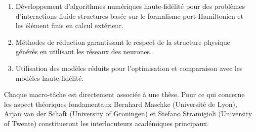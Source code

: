 \documentclass[12pt, french]{article}
\begin{document}
\begin{enumerate}
	\item Développement d'algorithmes numériques haute-fidélité pour des problèmes d'interactions fluide-structures basée sur le formalisme port-Hamiltonien et les élément finis en calcul extérieur.
	\item Méthodes de réduction garantissant le respect de la structure physique générés en utilisant les réseaux des neurones. 
	\item Utilisation des modèles réduits pour l'optimisation et comparaison avec les  modèles haute-fidélité.
\end{enumerate}

Chaque macro-tâche est directement associ\'ee \`a une thèse. Pour ce qui concerne les aspect théoriques fondamentaux Bernhard Maschke (Universit\'e de Lyon), Arjan van der Schaft (University of Groningen) et Stefano Stramigioli (University of Twente) constitueront les interlocuteurs académiques principaux.
\end{document}
